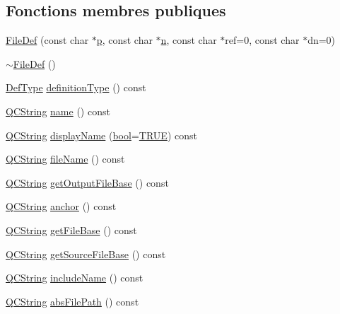 \subsection*{Fonctions membres publiques}
\begin{DoxyCompactItemize}
\item 
\hyperlink{class_file_def_aa0f1d4c412599b7c03d214c939e1ca95}{File\+Def} (const char $\ast$\hyperlink{060__command__switch_8tcl_a15229b450f26d8fa1c10bea4f3279f4d}{p}, const char $\ast$\hyperlink{060__command__switch_8tcl_acdde3cd86eb2421ce8dbb2e85227d368}{n}, const char $\ast$ref=0, const char $\ast$dn=0)
\item 
\hyperlink{class_file_def_a5ed8a95230184de0f82d21bf08f4ac0a}{$\sim$\+File\+Def} ()
\item 
\hyperlink{class_definition_intf_ada60114bc621669dd8c19edfc6421766}{Def\+Type} \hyperlink{class_file_def_a07b59f78f008528d1fe668f263f5782b}{definition\+Type} () const 
\item 
\hyperlink{class_q_c_string}{Q\+C\+String} \hyperlink{class_file_def_a80989971450b35c785a8fe0002e1c2db}{name} () const 
\item 
\hyperlink{class_q_c_string}{Q\+C\+String} \hyperlink{class_file_def_ab075e2ace8cba475de669e96ae19c7a2}{display\+Name} (\hyperlink{qglobal_8h_a1062901a7428fdd9c7f180f5e01ea056}{bool}=\hyperlink{qglobal_8h_a04a6422a52070f0dc478693da640242b}{T\+R\+U\+E}) const 
\item 
\hyperlink{class_q_c_string}{Q\+C\+String} \hyperlink{class_file_def_ab68cdf42899ae3dd24cb6ead2a2145a0}{file\+Name} () const 
\item 
\hyperlink{class_q_c_string}{Q\+C\+String} \hyperlink{class_file_def_aed87b82d9fc3ce4629034232b711f4a9}{get\+Output\+File\+Base} () const 
\item 
\hyperlink{class_q_c_string}{Q\+C\+String} \hyperlink{class_file_def_a01e0018f5093f7cf317f968c42e51318}{anchor} () const 
\item 
\hyperlink{class_q_c_string}{Q\+C\+String} \hyperlink{class_file_def_a359ac2e3984b4cf00bbfaa1d962fe37d}{get\+File\+Base} () const 
\item 
\hyperlink{class_q_c_string}{Q\+C\+String} \hyperlink{class_file_def_a88b2109d1ccc5835bcf05e238699d673}{get\+Source\+File\+Base} () const 
\item 
\hyperlink{class_q_c_string}{Q\+C\+String} \hyperlink{class_file_def_a7ae51c3b256e80b82f83f5b550402c97}{include\+Name} () const 
\item 
\hyperlink{class_q_c_string}{Q\+C\+String} \hyperlink{class_file_def_aae767e854233ec05108d7dccf458d27d}{abs\+File\+Path} () const 

\end{DoxyCompactItemize}
